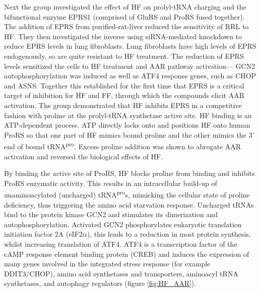 Next the group investigated the effect of HF on prolyl-tRNA charging and the bifunctional enzyme EPRS1 (comprised of GluRS and ProRS fused together).
The addition of EPRS from purified-rat-liver reduced the sensitivity of RRL to HF.
They then investigated the inverse using siRNA-mediated knockdown to reduce EPRS levels in lung fibroblasts.
Lung fibroblasts have high levels of EPRS endogenously, so are quite resistant to HF treatment.
The reduction of EPRS levels sensitized the cells to HF treatment and AAR pathway activation--- GCN2 autophosphorylation was induced as well as ATF4 response genes, such as CHOP and ASNS\@.
Together this established for the first time that EPRS is a critical target of inhibition for HF and FF, through which the compounds elicit AAR activation.
The group demonstrated that HF inhibits EPRS in a competitive fashion with proline at the prolyl-tRNA synthetase active site.
HF binding is an ATP-dependent process.
ATP directly locks onto and positions HF onto human ProRS so that one part of HF mimics bound proline and the other mimics the 3' end of bound tRNA\textsuperscript{pro}\cite{zhou2013atp}.
Excess proline addition was shown to abrogate AAR activation and reversed the biological effects of HF\cite{keller2012halofuginone}.

By binding the active site of ProRS, HF blocks proline from binding and inhibits ProRS enzymatic activity.
This results in an intracellular build-up of unaminoacylated (uncharged) tRNA\textsuperscript{pro}s, mimicking the cellular state of proline deficiency, thus triggering the amino acid starvation response.
Uncharged tRNAs bind to the protein kinase GCN2 and stimulates its dimerization and autophosphorylation.
Activated GCN2 phosphorylates eukaryotic translation initiation factor 2A (eIF2$\alpha$), this leads to a reduction in most protein synthesis, whilst increasing translation of ATF4.
ATF4 is a transcription factor of the cAMP response element binding protein (CREB) and induces the expression of many genes involved in the integrated stress response (for example DDIT3/CHOP), amino acid synthetases and transporters, aminoacyl tRNA synthetases, and autophagy regulators (figure \ref{fig:HF_AAR})\cite{ye2015gcn2, sundrud2009halofuginone}.

